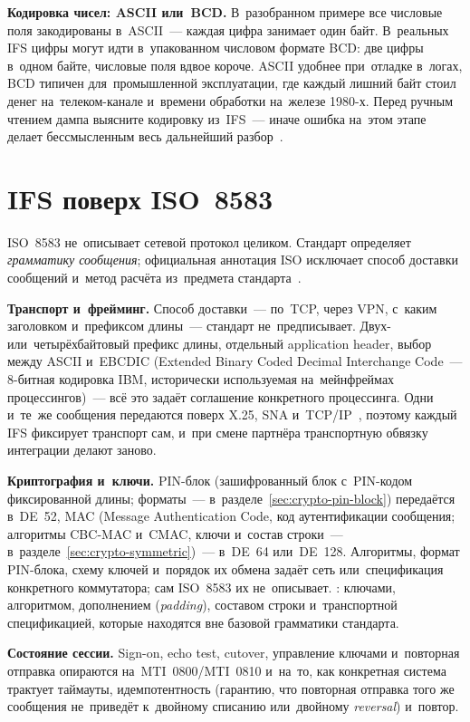 \textbf{Кодировка чисел: ASCII или~BCD.} В~разобранном примере все числовые
поля закодированы в~ASCII~--- каждая цифра занимает один байт. В~реальных IFS
цифры могут идти в~упакованном числовом формате BCD: две
цифры в~одном байте, числовые поля вдвое короче. ASCII удобнее при~отладке
в~логах, BCD типичен для~промышленной эксплуатации, где каждый лишний байт
стоил денег на~телеком-канале и~времени обработки на~железе 1980-х. Перед
ручным чтением дампа выясните кодировку из~IFS~--- иначе ошибка на~этом этапе
делает бессмысленным весь дальнейший разбор~\cite{fis-iso8583-guide-2023}.

\section{IFS поверх ISO~8583}\label{sec:iso8583-implementations}

ISO~8583 не~описывает сетевой протокол целиком. Стандарт определяет
\emph{грамматику сообщения}; официальная аннотация ISO исключает способ
доставки сообщений и~метод расчёта из~предмета стандарта~\cite{iso-8583-2023}.

\textbf{Транспорт и~фрейминг.} Способ доставки~--- по~TCP, через VPN, с~каким
заголовком и~префиксом длины~--- стандарт не~предписывает. Двух-
или~четырёхбайтовый префикс длины, отдельный application header, выбор между
ASCII и~EBCDIC (Extended Binary Coded Decimal Interchange Code~--- 8-битная
кодировка IBM, исторически используемая на~мейнфреймах процессингов)~--- всё
это задаёт соглашение конкретного процессинга. Одни и~те~же сообщения
передаются поверх X.25, SNA и~TCP/IP~\cite{mypos-iso8583}, поэтому каждый IFS
фиксирует транспорт сам, и~при смене партнёра транспортную обвязку
интеграции делают заново.

\textbf{Криптография и~ключи.} PIN-блок (зашифрованный блок с~PIN-кодом
фиксированной длины; форматы~--- в~разделе~\ref{sec:crypto-pin-block}) передаётся
в~DE~52, MAC (Message Authentication Code, код аутентификации сообщения;
  алгоритмы CBC-MAC и~CMAC, ключи и~состав строки~---
в~разделе~\ref{sec:crypto-symmetric})~--- в~DE~64 или~DE~128. Алгоритмы, формат
PIN-блока, схему ключей и~порядок их обмена задаёт сеть или~спецификация
конкретного коммутатора; сам ISO~8583 их не~описывает. :
ключами, алгоритмом, дополнением (\textit{padding}), составом строки
и~транспортной спецификацией, которые находятся вне базовой грамматики
стандарта.

\textbf{Состояние сессии.} Sign-on, echo test, cutover, управление ключами
и~повторная отправка опираются на~MTI~0800/MTI~0810 и~на~то, как конкретная
система трактует таймауты, идемпотентность (гарантию, что повторная отправка
того же сообщения не~приведёт к~двойному списанию или~двойному \textit{reversal}) и~повтор.

